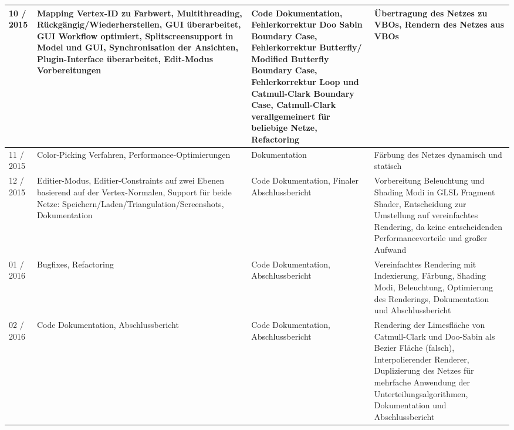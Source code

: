 \begin{table}[]
\begin{tabular}{p{1.6cm}|p{5cm}|p{5cm}|p{5cm}}
\hline

10 / 2015 & Mapping Vertex-ID zu Farbwert,
			Multithreading, Rückgängig/Wiederherstellen,
			GUI überarbeitet, GUI Workflow optimiert,
			Splitscreensupport in Model und GUI,
			Synchronisation der Ansichten,
			Plugin-Interface überarbeitet,
			Edit-Modus Vorbereitungen
		  & Code Dokumentation, Fehlerkorrektur Doo Sabin Boundary Case,
		    Fehlerkorrektur Butterfly/ Modified Butterfly Boundary Case,
		    Fehlerkorrektur Loop und Catmull-Clark Boundary Case,
		    Catmull-Clark verallgemeinert für beliebige Netze, Refactoring
		  & Übertragung des Netzes zu VBOs,
			Rendern des Netzes aus VBOs
		  \\
		  
\hline

11 / 2015 & Color-Picking Verfahren,
			Performance-Optimierungen
		  & Dokumentation
		  & Färbung des Netzes dynamisch und statisch
		  \\
		  
\hline

12 / 2015 & Editier-Modus, Editier-Constraints
			auf zwei Ebenen basierend auf der
			Vertex-Normalen, Support für beide
			Netze: Speichern/Laden/Triangulation/Screenshots,
			Dokumentation
		  & Code Dokumentation, Finaler Abschlussbericht
		  & Vorbereitung Beleuchtung und Shading Modi in GLSL
		    Fragment Shader, Entscheidung zur Umstellung auf
		    vereinfachtes Rendering, da keine entscheidenden
		    Performancevorteile und großer Aufwand
		  \\   

\hline

01 / 2016 & Bugfixes, Refactoring
		  & Code Dokumentation, Abschlussbericht
		  & Vereinfachtes Rendering mit Indexierung,
			Färbung, Shading Modi, Beleuchtung,
			Optimierung des Renderings,
			Dokumentation und Abschlussbericht
		  \\    
		  
\hline

02 / 2016 & Code Dokumentation, Abschlussbericht
		  & Code Dokumentation, Abschlussbericht
		  & Rendering der Limesfläche von Catmull-Clark und Doo-Sabin
		    als Bezier Fläche (falsch),
		    Interpolierender Renderer,
		    Duplizierung des Netzes für mehrfache
		    Anwendung der Unterteilungsalgorithmen,
		    Dokumentation und Abschlussbericht
		  \\  
		  

\end{tabular}
\label{tab:verlauf}
\end{table}

